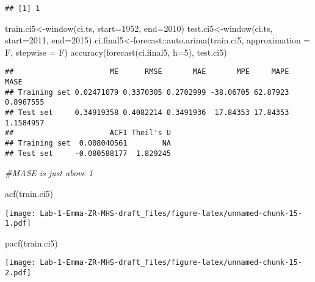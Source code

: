 \documentclass[
]{article}
\newenvironment{Shaded}{\begin{snugshade}}{\end{snugshade}}
\newcommand{\AttributeTok}[1]{\textcolor[rgb]{0.77,0.63,0.00}{#1}}
\newcommand{\CommentTok}[1]{\textcolor[rgb]{0.56,0.35,0.01}{\textit{#1}}}
\newcommand{\DecValTok}[1]{\textcolor[rgb]{0.00,0.00,0.81}{#1}}
\newcommand{\FunctionTok}[1]{\textcolor[rgb]{0.00,0.00,0.00}{#1}}
\newcommand{\NormalTok}[1]{#1}
\newcommand{\OtherTok}[1]{\textcolor[rgb]{0.56,0.35,0.01}{#1}}
\newcommand{\SpecialCharTok}[1]{\textcolor[rgb]{0.00,0.00,0.00}{#1}}
\begin{document}
\begin{verbatim}
## [1] 1
\end{verbatim}

\begin{Shaded}
\begin{Highlighting}[]
\NormalTok{train.ci5}\OtherTok{\textless{}{-}}\FunctionTok{window}\NormalTok{(ci.ts, }\AttributeTok{start=}\DecValTok{1952}\NormalTok{, }\AttributeTok{end=}\DecValTok{2010}\NormalTok{)}
\NormalTok{test.ci5}\OtherTok{\textless{}{-}}\FunctionTok{window}\NormalTok{(ci.ts, }\AttributeTok{start=}\DecValTok{2011}\NormalTok{, }\AttributeTok{end=}\DecValTok{2015}\NormalTok{)}
\NormalTok{ci.final5}\OtherTok{\textless{}{-}}\NormalTok{forecast}\SpecialCharTok{::}\FunctionTok{auto.arima}\NormalTok{(train.ci5, }\AttributeTok{approximation =}\NormalTok{ F, }\AttributeTok{stepwise =}\NormalTok{ F)}
\FunctionTok{accuracy}\NormalTok{(}\FunctionTok{forecast}\NormalTok{(ci.final5, }\AttributeTok{h=}\DecValTok{5}\NormalTok{), test.ci5)}
\end{Highlighting}
\end{Shaded}

\begin{verbatim}
##                      ME      RMSE       MAE       MPE     MAPE      MASE
## Training set 0.02471079 0.3370305 0.2702999 -38.06705 62.87923 0.8967555
## Test set     0.34919358 0.4082214 0.3491936  17.84353 17.84353 1.1584957
##                      ACF1 Theil's U
## Training set  0.008040561        NA
## Test set     -0.080588177  1.829245
\end{verbatim}

\begin{Shaded}
\begin{Highlighting}[]
\CommentTok{\#MASE is just above 1}

\FunctionTok{acf}\NormalTok{(train.ci5)}
\end{Highlighting}
\end{Shaded}

\texttt{[image: Lab-1-Emma-ZR-MHS-draft\_files/figure-latex/unnamed-chunk-15-1.pdf]}

\begin{Shaded}
\begin{Highlighting}[]
\FunctionTok{pacf}\NormalTok{(train.ci5)}
\end{Highlighting}
\end{Shaded}

\texttt{[image: Lab-1-Emma-ZR-MHS-draft\_files/figure-latex/unnamed-chunk-15-2.pdf]}
\end{document}
